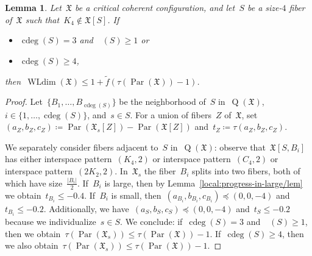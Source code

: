 \documentclass[english,a4paper]{article}
\theoremstyle{plain}
\newtheorem{lemma}      [theorem]{Lemma}
\theoremstyle{definition}
\newcommand{\abs}[1]{| #1 |}
\newcommand{\coherentConfig}{\ensuremath{\mathfrak{X}}}
\newcommand{\interspace}[2]{\ensuremath{\coherentConfig[#1,#2]}}
\newcommand{\inducedCC}[1]{\ensuremath{\coherentConfig[#1]}}
\DeclareMathOperator*{\WLdim}{WLdim}
\newcommand{\wldim}[1]{\ensuremath{\WLdim\left(#1\right)}}
\DeclareMathOperator*{\Quotient}{Q}
\newcommand{\quotientGraph}[1]{\ensuremath{\Quotient(#1)}}
\DeclareMathOperator{\ColorDeg}{cdeg}
\DeclareMathOperator{\ColorDegLarge}{cdeg_L}
\newcommand{\colorDeg}[1]{\ensuremath{\ColorDeg\left(#1\right)}}
\newcommand{\colorDegLarge}[1]{\ensuremath{\ColorDegLarge\left(#1\right)}}
\newcommand{\f}{f}
\DeclareMathOperator{\parameters}{Par}
\newcommand{\ipfourClique}  {\ensuremath{(\clique{4},2)}}
\newcommand{\ipfourMatching}{\ensuremath{(\disjointCliques{2}{2},2)}}
\newcommand{\ipfourCycle}   {\ensuremath{(\cycle{4},2)}}
\newcommand{\clique}[1]{\ensuremath{K_{#1}}}
\newcommand{\cycle}[1]{\ensuremath{C_{#1}}}
\newcommand{\disjointCliques}[2]{\ensuremath{#1 \clique{#2}}}
\begin{document}
\begin{lemma}
\label{local:4cc:3neighbors/lem}
    Let~$\coherentConfig$ be a critical coherent configuration, and let~$S$ be a size-$4$ fiber of~$\coherentConfig$ such that~$\clique{4} \notin\inducedCC{S}$.
    If~
    \begin{itemize}
        \item $\colorDeg{S} = 3$ and~$\colorDegLarge{S} \geq 1$ or
        \item $\colorDeg{S} \geq 4$,
    \end{itemize}
    then~$\wldim{\coherentConfig} \leq 1 + \widetilde{\f}( \tau(\parameters(\coherentConfig)) - 1)$.
\end{lemma}
\begin{proof}
    Let~$\{B_1,\dots,B_{\colorDeg{S}}\}$ be the neighborhood of~$S$ in~$\quotientGraph{\coherentConfig}$, $i \in \{1,\dots,\colorDeg{S}\}$, and~$s \in S$.
    For a union of fibers~$Z$  of~$\coherentConfig$, set~$(a_Z,b_Z,c_Z) \coloneqq \parameters(\coherentConfig_{s}[Z]) - \parameters(\coherentConfig[Z])$ and~$t_Z \coloneqq \tau(a_Z,b_Z,c_Z)$.

    We separately consider fibers adjacent to~$S$ in~$\quotientGraph{\coherentConfig}$:
    observe that~$\interspace{S}{B_i}$ has either interspace pattern~$\ipfourClique$ or interspace pattern~$\ipfourCycle$ or interspace pattern~$\ipfourMatching$.
    In~$\coherentConfig_s$ the fiber~$B_i$ splits into two fibers, both of which have size~$\frac{\abs{B_i}}{2}$.
    If~$B_i$ is large, then by Lemma~\ref{local:progress-in-large/lem} we obtain~$t_{B_i} \leq -0.4$.
    If~$B_i$ is small, then~$(a_{B_i},b_{B_i},c_{B_i}) \preceq (0,0,-4) $ and~$t_{B_i} \leq - 0.2$.
    Additionally, we have~$(a_S,b_S,c_S) \preceq (0,0,-4)$ and~$t_S \leq - 0.2$ because we individualize~$s \in S$.
    We conclude:
    if~$\colorDeg{S} = 3$ and~$\colorDegLarge{S} \geq 1$, then we obtain~$\tau(\parameters(\coherentConfig_s)) \leq \tau(\parameters(\coherentConfig))- 1$.
    If~$\colorDeg{S} \geq 4$, then we also obtain~$\tau(\parameters(\coherentConfig_s)) \leq \tau(\parameters(\coherentConfig))- 1$.
\end{proof}
\end{document}
